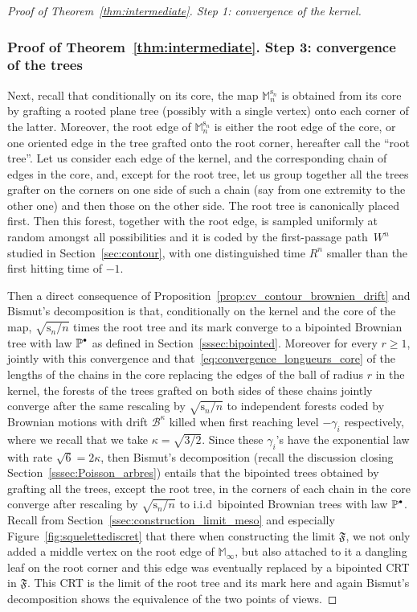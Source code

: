 \documentclass[10pt]{amsart}
\newcommand{\sbullet}{{\raisebox{1pt}{$\scriptscriptstyle\bullet $}}}
\theoremstyle{plain}
\theoremstyle{definition}
\theoremstyle{remark}
\renewcommand{\P}{\mathbb{P}}
\newcommand{\Mapb}{\mathbb{M}}
\newcommand{\spar}{\mathrm{s}}
\begin{document}
\begin{proof}[Proof of Theorem~\ref{thm:intermediate}. Step 1: convergence of the kernel]
\subsubsection*{Proof of Theorem~\ref{thm:intermediate}. Step 3: convergence of the trees}
Next, recall that conditionally on its core, the map $\Mapb_n^{\spar_n}$ is obtained from its core by grafting a rooted plane tree (possibly with a single vertex) onto each corner of the latter. Moreover, the root edge of $\Mapb_n^{\spar_n}$ is either the root edge of the core, or one oriented edge in the tree grafted onto the root corner, hereafter call the ``root tree''.
Let us consider each edge of the kernel, and the corresponding chain of edges in the core, and, except for the root tree, let us group together all the trees grafter on the corners on one side of such a chain (say from one extremity to the other one) and then those on the other side. The root tree is canonically placed first.
Then this forest, together with the root edge, is sampled uniformly at random amongst all possibilities and it is coded by the first-passage path~$W^n$ studied in Section~\ref{sec:contour}, with one distinguished time $R^n$ smaller than the first hitting time of $-1$.

Then a direct consequence of Proposition~\ref{prop:cv_contour_brownien_drift} and Bismut's decomposition is that, conditionally on the kernel and the core of the map, $\sqrt{\spar_n/n}$ times the root tree and its mark converge to a bipointed Brownian tree with law $ \P^{\sbullet}$ as defined in Section~\ref{sssec:bipointed}. Moreover for every $r \ge 1$, jointly with this convergence and that~\eqref{eq:convergence_longueurs_core} of the lengths of the chains in the core replacing the edges of the ball of radius $r$ in the kernel, the forests of the trees grafted on both sides of these chains jointly converge after the same rescaling by $\sqrt{\spar_n/n}$ to independent forests coded by Brownian motions with drift $\mathcal{B}^\kappa$ killed when first reaching level $-\gamma_i$ respectively, where we recall that we take $\kappa = \sqrt{3/2}$. Since these $\gamma_i$'s have the exponential law with rate $\sqrt{6} = 2\kappa$, then Bismut's decomposition (recall the discussion closing Section~\ref{sssec:Poisson_arbres}) entails that the bipointed trees obtained by grafting all the trees, except the root tree, in the corners of each chain in the core converge after rescaling by $\sqrt{\spar_n/n}$ to i.i.d~bipointed Brownian trees with law $ \P^{\sbullet}$.
Recall from Section~\ref{ssec:construction_limit_meso} and especially Figure~\ref{fig:squelettediscret} that there when constructing the limit $\mathfrak{F}$, we not only added a middle vertex on the root edge of $\Mapb_\infty$, but also attached to it a dangling leaf on the root corner and this edge was eventually replaced by a bipointed CRT in $\mathfrak{F}$. This CRT is the limit of the root tree and its mark here and again Bismut's decomposition shows the equivalence of the two points of views.


\end{proof}
\end{document}

